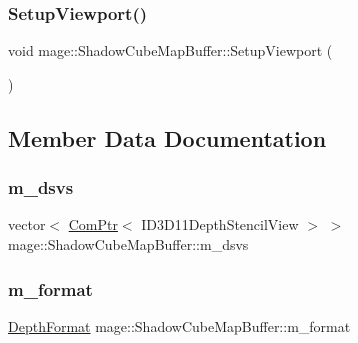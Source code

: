 \subsubsection{\texorpdfstring{Setup\+Viewport()}{SetupViewport()}}
{\footnotesize\ttfamily void mage\+::\+Shadow\+Cube\+Map\+Buffer\+::\+Setup\+Viewport (\begin{DoxyParamCaption}{ }\end{DoxyParamCaption})\hspace{0.3cm}{\ttfamily [private]}}



\subsection{Member Data Documentation}
\hypertarget{structmage_1_1_shadow_cube_map_buffer_aa0db6bec24d63c39c85400c4328190fc}{}\label{structmage_1_1_shadow_cube_map_buffer_aa0db6bec24d63c39c85400c4328190fc} 
\subsubsection{\texorpdfstring{m\+\_\+dsvs}{m\_dsvs}}
{\footnotesize\ttfamily vector$<$ \hyperlink{namespacemage_ae74f374780900893caa5555d1031fd79}{Com\+Ptr}$<$ I\+D3\+D11\+Depth\+Stencil\+View $>$ $>$ mage\+::\+Shadow\+Cube\+Map\+Buffer\+::m\+\_\+dsvs\hspace{0.3cm}{\ttfamily [private]}}

\hypertarget{structmage_1_1_shadow_cube_map_buffer_ada9a7c895a74303904f9884b986c935f}{}\label{structmage_1_1_shadow_cube_map_buffer_ada9a7c895a74303904f9884b986c935f} 
\subsubsection{\texorpdfstring{m\+\_\+format}{m\_format}}
{\footnotesize\ttfamily \hyperlink{namespacemage_aed4c3f883a30484d0a20762c06be81d4}{Depth\+Format} mage\+::\+Shadow\+Cube\+Map\+Buffer\+::m\+\_\+format\hspace{0.3cm}{\ttfamily [private]}}

\hypertarget{structmage_1_1_shadow_cube_map_buffer_ac20a53ecc1ec9a00a2241f8c8a3405e6}{}\label{structmage_1_1_shadow_cube_map_buffer_ac20a53ecc1ec9a00a2241f8c8a3405e6} 
